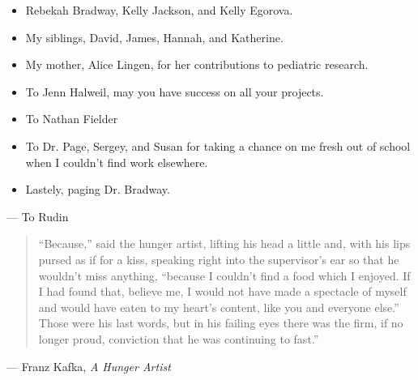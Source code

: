 \begin{titlepage}
\begin{itemize}
        \item Rebekah Bradway, Kelly Jackson, and Kelly Egorova.
        \item My siblings, David, James, Hannah, and Katherine.
        \item My mother, Alice Lingen, for her contributions to pediatric research.
        \item To Jenn Halweil, may you have success on all your projects.
        \item To Nathan Fielder
        \item To Dr. Page, Sergey, and Susan for taking a chance on me fresh out of school when I couldn't find work elsewhere.
        \item Lastely, paging Dr. Bradway.
    \end{itemize}
    \vfill

\hfill --- To Rudin

\begin{quote}
“Because,” said the hunger artist, lifting his head a little and, with his lips pursed as if for a kiss, speaking right into the supervisor’s ear so that he wouldn’t miss anything, “because I couldn’t find a food which I enjoyed. If I had found that, believe me, I would not have made a spectacle of myself and would have eaten to my heart’s content, like you and everyone else.” Those were his last words, but in his failing eyes there was the firm, if no longer proud, conviction that he was continuing to fast.”
\end{quote}

\hfill --- Franz Kafka, \textit{A Hunger Artist}

\end{titlepage}
